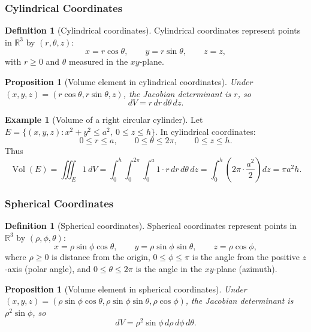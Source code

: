 \documentclass[12pt]{article}
\numberwithin{equation}{section}
\newcommand{\RR}{\mathbb{R}}
\theoremstyle{plain}
\newtheorem{proposition}[theorem]{Proposition}
\theoremstyle{definition}
\newtheorem{definition}[theorem]{Definition}
\newtheorem{example}[theorem]{Example}
\theoremstyle{remark}
\begin{document}
\subsubsection{Cylindrical Coordinates}

\begin{definition}[Cylindrical coordinates]\label{def:cyl}
Cylindrical coordinates represent points in $\RR^3$ by $(r,\theta,z)$:
\[
x=r\cos\theta,\qquad y=r\sin\theta,\qquad z=z,
\]
with $r\ge 0$ and $\theta$ measured in the $xy$-plane.
\end{definition}

\begin{proposition}[Volume element in cylindrical coordinates]\label{prop:cyl-vol}
Under $(x,y,z)=(r\cos\theta,r\sin\theta,z)$, the Jacobian determinant is $r$, so
\begin{equation}\label{eq:cyl-dV}
dV=r\,dr\,d\theta\,dz.
\end{equation}
\end{proposition}

\begin{example}[Volume of a right circular cylinder]
Let $E=\{(x,y,z):x^2+y^2\le a^2,\ 0\le z\le h\}$. In cylindrical coordinates:
\[
0\le r\le a,\qquad 0\le \theta\le 2\pi,\qquad 0\le z\le h.
\]
Thus
\[
\operatorname{Vol}(E)=\iiint_E 1\,dV
=\int_{0}^{h}\int_{0}^{2\pi}\int_{0}^{a} 1\cdot r\,dr\,d\theta\,dz
=\int_{0}^{h}\left(2\pi\cdot \frac{a^2}{2}\right)dz
=\pi a^2 h.
\]
\end{example}

\subsubsection{Spherical Coordinates}

\begin{definition}[Spherical coordinates]\label{def:sph}
Spherical coordinates represent points in $\RR^3$ by $(\rho,\phi,\theta)$:
\[
x=\rho\sin\phi\cos\theta,\qquad
y=\rho\sin\phi\sin\theta,\qquad
z=\rho\cos\phi,
\]
where $\rho\ge 0$ is distance from the origin, $0\le \phi\le \pi$ is the angle from the positive $z$-axis (polar angle), and $0\le \theta\le 2\pi$ is the angle in the $xy$-plane (azimuth).
\end{definition}

\begin{proposition}[Volume element in spherical coordinates]\label{prop:sph-vol}
Under $(x,y,z)=(\rho\sin\phi\cos\theta,\allowbreak \rho\sin\phi\sin\theta,\allowbreak \rho\cos\phi)$, the Jacobian determinant is $\rho^2\sin\phi$, so
\begin{equation}\label{eq:sph-dV}
dV=\rho^2\sin\phi\,d\rho\,d\phi\,d\theta.
\end{equation}
\end{proposition}
\end{document}
